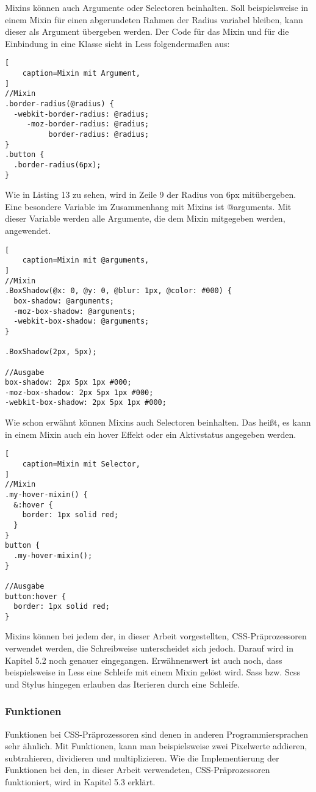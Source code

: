 Mixins können auch Argumente oder Selectoren beinhalten. \newline
Soll beispielsweise in einem Mixin für einen abgerundeten Rahmen der Radius variabel bleiben, kann dieser als Argument übergeben werden. Der Code für das Mixin und für die Einbindung in eine Klasse sieht in Less folgendermaßen aus:
\begin{lstlisting}[
	caption=Mixin mit Argument,
]
//Mixin
.border-radius(@radius) {
  -webkit-border-radius: @radius;
     -moz-border-radius: @radius;
          border-radius: @radius;
}
.button {
  .border-radius(6px);
}
\end{lstlisting}
Wie in Listing 13 zu sehen, wird in Zeile 9 der Radius von 6px mitübergeben. \autocite[]{thecorelessteam.}\newline 
Eine besondere Variable im Zusammenhang mit Mixins ist @arguments. Mit dieser Variable werden alle Argumente, die dem Mixin mitgegeben werden, angewendet. \autocite[]{Gerchev.2012}
\begin{lstlisting}[
	caption=Mixin mit @arguments,
]
//Mixin
.BoxShadow(@x: 0, @y: 0, @blur: 1px, @color: #000) {
  box-shadow: @arguments;
  -moz-box-shadow: @arguments;
  -webkit-box-shadow: @arguments;
}

.BoxShadow(2px, 5px);

//Ausgabe
box-shadow: 2px 5px 1px #000;
-moz-box-shadow: 2px 5px 1px #000;
-webkit-box-shadow: 2px 5px 1px #000;
\end{lstlisting}
Wie schon erwähnt können Mixins auch Selectoren beinhalten. Das heißt, es kann in einem Mixin auch ein hover Effekt oder ein Aktivstatus angegeben werden.
\begin{lstlisting}[
	caption=Mixin mit Selector,
]
//Mixin
.my-hover-mixin() {
  &:hover {
    border: 1px solid red;
  }
}
button {
  .my-hover-mixin();
}

//Ausgabe
button:hover {
  border: 1px solid red;
}
\end{lstlisting}
Mixins können bei jedem der, in dieser Arbeit vorgestellten, CSS-Präprozessoren verwendet werden, die Schreibweise unterscheidet sich jedoch. Darauf wird in Kapitel 5.2 noch genauer eingegangen.
Erwähnenswert ist auch noch, dass beispielsweise in Less eine Schleife mit einem Mixin gelöst wird. Sass bzw. Scss und Stylus hingegen erlauben das Iterieren durch eine Schleife.
\subsubsection{Funktionen}
Funktionen bei CSS-Präprozessoren sind denen in anderen Programmiersprachen sehr ähnlich. Mit Funktionen, kann man beispielsweise zwei Pixelwerte addieren, subtrahieren, dividieren und multiplizieren. Wie die Implementierung der Funktionen bei den, in dieser Arbeit verwendeten, CSS-Präprozessoren funktioniert, wird in Kapitel 5.3 erklärt.
